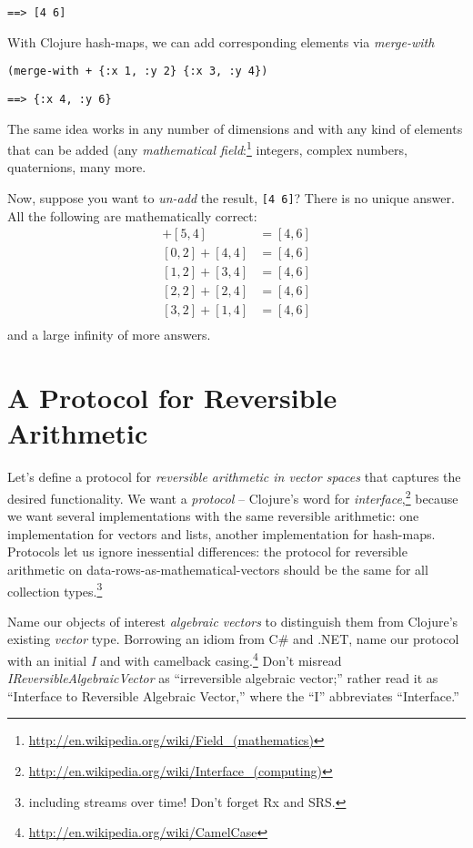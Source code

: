 \documentclass[11pt]{article}
\begin{document}
\begin{verbatim}
==> [4 6]
\end{verbatim}

With Clojure hash-maps, we can add corresponding elements via
\emph{merge-with}
\begin{verbatim}
(merge-with + {:x 1, :y 2} {:x 3, :y 4})
\end{verbatim}

\begin{verbatim}
==> {:x 4, :y 6}
\end{verbatim}

The same idea works in any number of dimensions and with any kind of
elements that can be added (any \emph{mathematical
field}:\footnote{\url{http://en.wikipedia.org/wiki/Field_(mathematics)}}
integers, complex numbers, quaternions, many more.

Now, suppose you want to \emph{un-add} the result, \verb|[4 6]|? There is
no unique answer.  All the following are mathematically correct:
\begin{align*}
[-1, 2] + [5, 4] &= [4, 6] \\
[ 0, 2] + [4, 4] &= [4, 6] \\
[ 1, 2] + [3, 4] &= [4, 6] \\
[ 2, 2] + [2, 4] &= [4, 6] \\
[ 3, 2] + [1, 4] &= [4, 6] \\
\end{align*}
and a large infinity of more answers.
\section{A Protocol for Reversible Arithmetic}
\label{sec-3}

Let's define a protocol for \emph{reversible arithmetic in vector spaces}
that captures the desired functionality.  We want a \emph{protocol} --
Clojure's word for
\emph{interface},\footnote{\url{http://en.wikipedia.org/wiki/Interface_(computing)}}
because we want several implementations with the same reversible
arithmetic: one implementation for vectors and lists, another
implementation for hash-maps.  Protocols let us ignore inessential
differences: the protocol for reversible arithmetic on
data-rows-as-mathematical-vectors should be the same for all
collection types.\footnote{including streams over time! Don't forget Rx and
  SRS.}

Name our objects of interest \emph{algebraic vectors} to distinguish them
from Clojure's existing \emph{vector} type. Borrowing an idiom from C\# and
.NET, name our protocol with an initial \emph{I} and with camelback
casing.\footnote{\url{http://en.wikipedia.org/wiki/CamelCase}} Don't misread
\emph{IReversibleAlgebraicVector} as ``irreversible algebraic vector;''
rather read it as ``Interface to Reversible Algebraic Vector,'' where
the ``I'' abbreviates ``Interface.''
\end{document}

